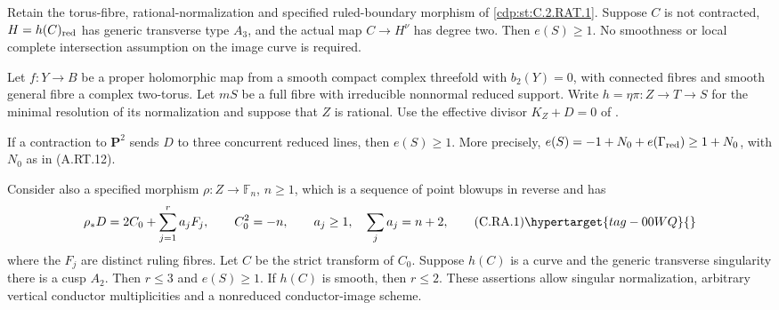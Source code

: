 
\begin{proposition}\hypertarget{tag-01CG}{}\label{cdp:st:C.2.RAT.4}


Retain the torus-fibre, rational-normalization and specified
ruled-boundary morphism of \ref{cdp:st:C.2.RAT.1}. Suppose $C$ is not
contracted, $H=h(C)_{\rm red}$ has generic transverse type
$A_3$, and the actual map $C\to H^\nu$ has degree two.
Then $e(S)\ge1$. No smoothness or local complete intersection
assumption on the image curve is required.
\end{proposition}

\begin{proposition}\hypertarget{tag-01CD}{}\label{cdp:st:C.2.RAT.1}


Let $f:Y\to B$ be a proper holomorphic map from a smooth compact
complex threefold with $b_2(Y)=0$, with connected fibres and smooth
general fibre a complex two-torus. Let $mS$ be a full fibre with
irreducible nonnormal reduced support. Write
$h=\eta\pi:Z\to T\to S$ for the minimal resolution of its
normalization and suppose that $Z$ is rational. Use the effective
divisor $K_Z+D=0$ of .

If a contraction to $\mathbf P^2$ sends $D$ to three concurrent
reduced lines, then $e(S)\ge1$. More precisely,
$e(S)=-1+N_0+e(\Gamma_{\rm red})\ge1+N_0$, with $N_0$ as in
(A.RT.12).

Consider also a specified morphism $\rho:Z\to\mathbb F_n$,
$n\ge1$, which is a sequence of point blowups in reverse and has
\[
 \rho_*D=2C_0+\sum_{j=1}^r a_jF_j,\qquad
 C_0^2=-n,\qquad
 a_j\ge1,\quad \sum_j a_j=n+2,                  \tag{C.RA.1}\hypertarget{tag-00WQ}{}\label{cdp:eq:C.RA.1}
\]
where the $F_j$ are distinct ruling fibres. Let $C$ be the
strict transform of $C_0$. Suppose $h(C)$ is a curve and the
generic transverse singularity there is a cusp $A_2$.
Then $r\le3$ and $e(S)\ge1$. If $h(C)$ is smooth, then
$r\le2$. These assertions allow singular normalization,
arbitrary vertical conductor multiplicities and a nonreduced
conductor-image scheme.
\end{proposition}

